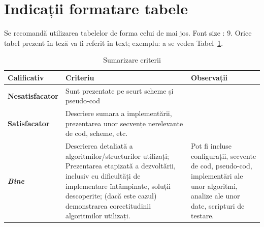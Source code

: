\documentclass[12pt,a4paper]{report}
\numberwithin{equation}{section} %
\begin{document}
\section{Indicații formatare tabele}
Se recomandă utilizarea tabelelor de forma celui de mai jos.  Font size :  9.
Orice tabel prezent în teză va fi referit în text; exemplu: a se vedea Tabel~\ref{tab:criterii}.

\begin{table}[th]\small\linespread{1}
	\caption{Sumarizare criterii}
	\label{tab:criterii}
	\begin{tabular}{l >{\raggedright\arraybackslash}p{8cm} >{\raggedright\arraybackslash}p{4cm}}
		\textbf{Calificativ}    & \textbf{Criteriu}                                                                                                                                                                                                                                & \textbf{Observații}                                                                                                                     \\\hline
		\textbf{Nesatisfacator} & Sunt prezentate pe scurt scheme și pseudo-cod                                                                                                                                                                                                    &                                                                                                                                         \\\hline
		\textbf{Satisfacator}   & Descriere sumara a implementării, prezentarea unor secvențe nerelevante de cod, scheme, etc.                                                                                                                                                     &                                                                                                                                         \\
		\hline
		\textbf{\textit{Bine}}  & Descrierea detaliată a algoritmilor/structurilor utilizați; Prezentarea etapizată a dezvoltării, inclusiv cu dificultăți de implementare întâmpinate, soluții descoperite; (dacă este cazul) demonstrarea corectitudinii algoritmilor utilizați. & Pot fi incluse configurații, secvente de cod, pseudo-cod, implementări ale unor algoritmi, analize ale unor date, scripturi de testare. \\
		\hline
	\end{tabular}
\end{table}
\end{document}
